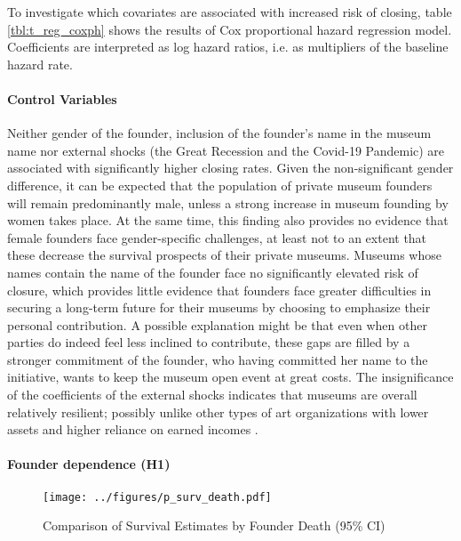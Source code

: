 \documentclass[12pt]{article}
\begin{document}
To investigate which covariates are associated with increased risk of closing, table \ref{tbl:t_reg_coxph} shows the results of Cox proportional hazard regression model.
Coefficients are interpreted as log hazard ratios, i.e. as multipliers of the baseline hazard rate.
\paragraph*{Control Variables}


Neither gender of the founder, inclusion of the founder's name in the museum name nor external shocks (the Great Recession and the Covid-19 Pandemic) are associated with significantly higher closing rates.
Given the non-significant gender difference, it can be expected that the population of private museum founders will remain predominantly male, unless a strong increase in museum founding by women takes place.
At the same time, this finding also provides no evidence that female founders face gender-specific challenges, at least not to an extent that these decrease the survival prospects of their private museums.
Museums whose names contain the name of the founder face no significantly elevated risk of closure, which provides little evidence that founders face greater difficulties in securing a long-term future for their museums by choosing to emphasize their personal contribution.
A possible explanation might be that even when other parties do indeed feel less inclined to contribute, these gaps are filled by a stronger commitment of the founder, who having committed her name to the initiative, wants to keep the museum open event at great costs.
The insignificance of the coefficients of the external shocks indicates that museums are overall relatively resilient; possibly unlike other types of art organizations with lower assets and higher reliance on earned incomes \parencite[p.102]{Bowen_etal_1994_charitable}.  
\paragraph*{Founder dependence (H1)}





\begin{figure}[htbp]
\centering
\texttt{[image: ../figures/p\_surv\_death.pdf]}
\caption{\label{fig:p_surv_death}Comparison of Survival Estimates by Founder Death (95\% CI)}
\end{figure}
\end{document}

